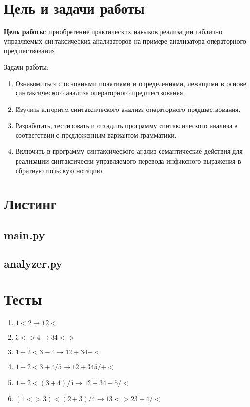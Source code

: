 \newpage
	\section{Цель и задачи работы}
		\textbf{Цель работы}: приобретение практических навыков реализации таблично управляемых синтаксических анализаторов на
		примере анализатора операторного предшествования

		Задачи работы:
		\begin{enumerate}
			\item Ознакомиться с основными понятиями и определениями, лежащими в основе синтаксического анализа операторного предшествования.
			\item Изучить алгоритм синтаксического анализа операторного предшествования.
			\item Разработать, тестировать и отладить программу синтаксического анализа в соответствии с предложенным
				вариантом грамматики.
			\item Включить в программу синтаксического анализ семантические действия для реализации синтаксически
				управляемого перевода инфиксного выражения в обратную польскую нотацию.
		\end{enumerate}


	\section{Листинг}
        
        
        \subsection{main.py}
        

        \subsection{analyzer.py}
        



	\section{Тесты}
		\begin{enumerate}
			\item $1 < 2 \rightarrow 12<$
			\item $3 <> 4 \rightarrow 34<>$
			\item $1 + 2 < 3 - 4 \rightarrow 12+34-<$
			\item $1 + 2 < 3 + 4 / 5 \rightarrow 12+345/+<$
			\item $1 + 2 < (3 + 4) / 5 \rightarrow 12+34+5/<$
			\item $(1 <> 3) < (2 + 3) / 4 \rightarrow 13<>23+4/<$
		\end{enumerate}



